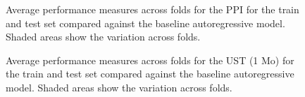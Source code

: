 \documentclass{article}
\theoremstyle{plain}
\theoremstyle{definition}
\theoremstyle{remark}
\begin{document}
\begin{figure}


\caption{\label{fig-ppi-b}Average performance measures across folds for the PPI for the train and test set compared against the baseline autoregressive model. Shaded areas show the variation across folds.}

\end{figure}%


\begin{figure}


\caption{\label{fig-ust-1-b}Average performance measures across folds for the UST (1 Mo) for the train and test set compared against the baseline autoregressive model. Shaded areas show the variation across folds.}

\end{figure}%

\end{document}
